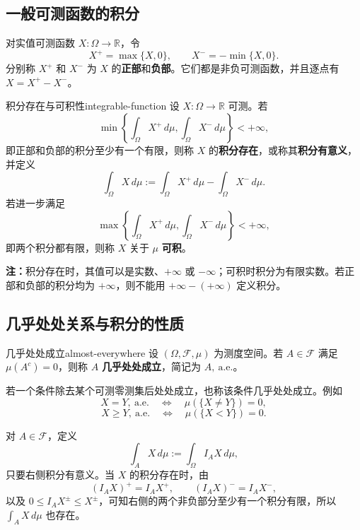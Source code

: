 \subsection*{一般可测函数的积分}

对实值可测函数 $X:\Omega\to\mathbb R$，令
\[
X^+=\max\{X,0\},\qquad X^-=-\min\{X,0\}.
\]
分别称 $X^+$ 和 $X^-$ 为 $X$ 的\textbf{正部}和\textbf{负部}。它们都是非负可测函数，并且逐点有 $X=X^+-X^-$。

\begin{mydefinition}{积分存在与可积性}{integrable-function}
设 $X:\Omega\to\mathbb R$ 可测。若
\[
\min\left\{\int_\Omega X^+\,d\mu,\int_\Omega X^-\,d\mu\right\}<+\infty,
\]
即正部和负部的积分至少有一个有限，则称 $X$ 的\textbf{积分存在}，或称其\textbf{积分有意义}，并定义
\[
\int_\Omega X\,d\mu
:=\int_\Omega X^+\,d\mu-\int_\Omega X^-\,d\mu.
\]
若进一步满足
\[
\max\left\{\int_\Omega X^+\,d\mu,\int_\Omega X^-\,d\mu\right\}<+\infty,
\]
即两个积分都有限，则称 $X$ 关于 $\mu$ \textbf{可积}。
\end{mydefinition}

\textbf{注：}\quad 积分存在时，其值可以是实数、$+\infty$ 或 $-\infty$；可积时积分为有限实数。若正部和负部的积分均为 $+\infty$，则不能用 $+\infty-(+\infty)$ 定义积分。

\subsection*{几乎处处关系与积分的性质}

\begin{mydefinition}{几乎处处成立}{almost-everywhere}
设 $(\Omega,\mathcal F,\mu)$ 为测度空间。若 $A\in\mathcal F$ 满足 $\mu(A^c)=0$，则称 $A$ \textbf{几乎处处成立}，简记为 $A,\ \mathrm{a.e.}$。

若一个条件除去某个可测零测集后处处成立，也称该条件几乎处处成立。例如
\[
X=Y,\ \mathrm{a.e.}\quad\Longleftrightarrow\quad
\mu(\{X\ne Y\})=0,
\]
\[
X\geq Y,\ \mathrm{a.e.}\quad\Longleftrightarrow\quad
\mu(\{X<Y\})=0.
\]
\end{mydefinition}

对 $A\in\mathcal F$，定义
\[
\int_A X\,d\mu:=\int_\Omega I_AX\,d\mu,
\]
只要右侧积分有意义。当 $X$ 的积分存在时，由
\[
(I_AX)^+=I_AX^+,\qquad (I_AX)^-=I_AX^-,
\]
以及 $0\leq I_AX^\pm\leq X^\pm$，可知右侧的两个非负部分至少有一个积分有限，所以 $\displaystyle\int_A X\,d\mu$ 也存在。

